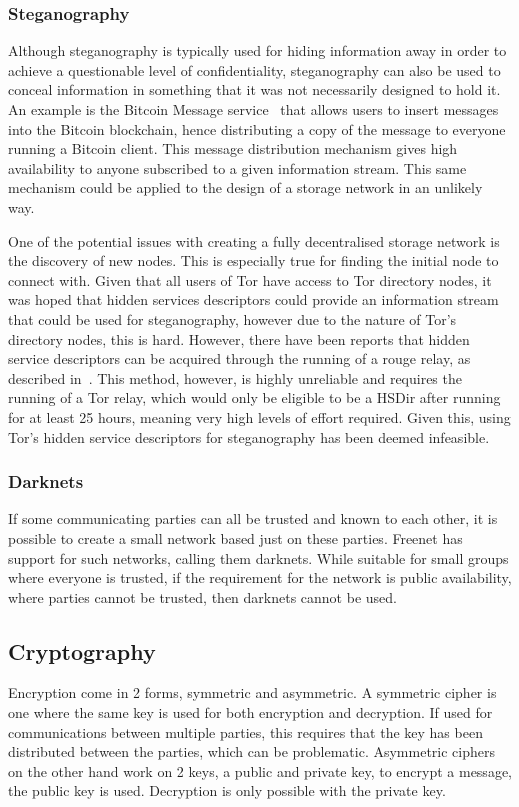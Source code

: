 		\subsubsection*{Steganography}
				Although steganography is typically used for hiding information away in order to achieve a questionable level of confidentiality, steganography can also be used to conceal information in something that it was not necessarily designed to hold it. An example is the Bitcoin Message service~\cite{btcmsg} that allows users to insert messages into the Bitcoin blockchain, hence distributing a copy of the message to everyone running a Bitcoin client. This message distribution mechanism gives high availability to anyone subscribed to a given information stream. This same mechanism could be applied to the design of a storage network in an unlikely way.
				
				One of the potential issues with creating a fully decentralised storage network is the discovery of new nodes. This is especially true for finding the initial node to connect with. Given that all users of Tor have access to Tor directory nodes, it was hoped that hidden services descriptors could provide an information stream that could be used for steganography, however due to the nature of Tor's directory nodes, this is hard. However, there have been reports that hidden service descriptors can be acquired through the running of a rouge relay, as described in~\cite{crawl}. This method, however, is highly unreliable and requires the running of a Tor relay, which would only be eligible to be a HSDir after running for at least 25 hours, meaning very high levels of effort required. Given this, using Tor's hidden service descriptors for steganography has been deemed infeasible.
		\subsubsection*{Darknets}
			If some communicating parties can all be trusted and known to each other, it is possible to create a small network based just on these parties. Freenet has support for such networks, calling them darknets. While suitable for small groups where everyone is trusted, if the requirement for the network is public availability, where parties cannot be trusted, then darknets cannot be used.
	\subsection{Cryptography}
		Encryption come in 2 forms, symmetric and asymmetric. A symmetric cipher is one where the same key is used for both encryption and decryption. If used for communications between multiple parties, this requires that the key has been distributed between the parties, which can be problematic. Asymmetric ciphers on the other hand work on 2 keys, a public and private key, to encrypt a message, the public key is used. Decryption is only possible with the private key. \cite{appliedcrypto}
		
